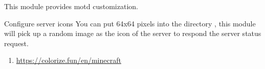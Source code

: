 This module provides motd customization.

\begin{example}{Configure server icons}
    You can put 64x64 pixels  into the directory , this module will pick up a random image as the icon of the server to respond the server status request.
\end{example}

\begin{enumerate}
    \item \url{https://colorize.fun/en/minecraft}
\end{enumerate}
